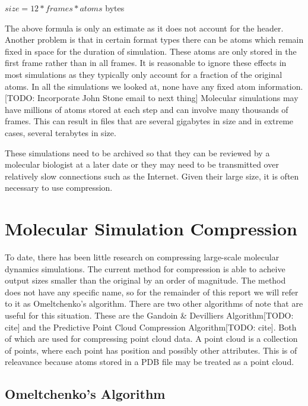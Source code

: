 \documentclass[a4paper,11pt]{report}
\begin{document}
\begin{center} $size = 12*frames*atoms$ bytes\end{center}

The above formula is only an estimate as it does not account for the header. Another problem is that in certain format types there can be atoms which remain fixed in space for the duration of simulation. These atoms are only stored in the first frame rather than in all frames. It is reasonable to ignore these effects in most simulations as they typically only account for a fraction of the original atoms. In all the simulations we looked at, none have any fixed atom information. [TODO: Incorporate John Stone email to next thing] Molecular simulations may have millions of atoms stored at each step and can involve many thousands of frames. This can result in files that are several gigabytes in size and in extreme cases, several terabytes in size.

These simulations need to be archived so that they can be reviewed by a molecular biologist at a later date or   they may need to be transmitted over relatively slow connections such as the Internet. Given their large size, it is often necessary to use compression.

\section{Molecular Simulation Compression}
\label{back_msc}
To date, there has been little research on compressing large-scale molecular dynamics simulations. The current method\cite{RefWorks:3} for compression is able to acheive output sizes smaller than the original by an order of magnitude. The method does not have any specific name, so for the remainder of this report we will refer to it as Omeltchenko's algorithm. There are two other algorithms of note that are useful for this situation. These are the Gandoin \& Devilliers Algorithm[TODO: cite] and the Predictive Point Cloud Compression Algorithm[TODO: cite]. Both of which are used for compressing point cloud data. A point cloud is a collection of points, where each point has position and possibly other attributes. This is of releavance because atoms stored in a PDB file may be treated as a point cloud.

\subsection{Omeltchenko's Algorithm}
\end{document}

